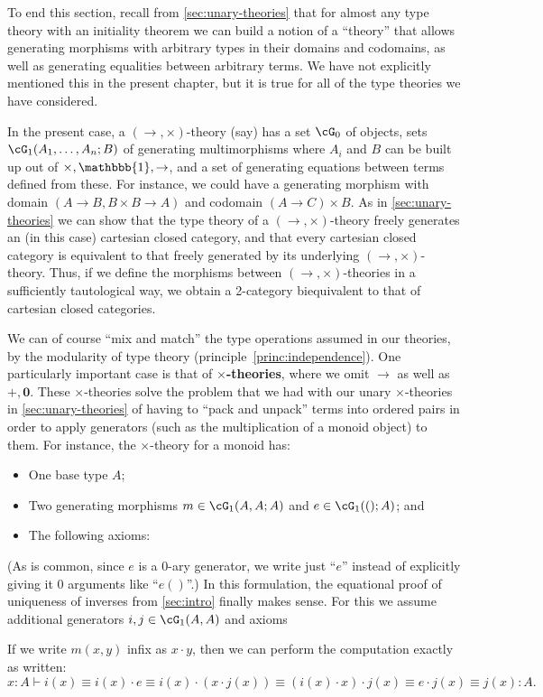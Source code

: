 \documentclass{book}
\let\types\vdash
\def\unit{\mathbbb{1}}%
\def\zero{\mathbf{0}}
\begin{document}
To end this section, recall from \cref{sec:unary-theories} that for almost any type theory with an initiality theorem we can build a notion of a ``theory'' that allows generating morphisms with arbitrary types in their domains and codomains, as well as generating equalities between arbitrary terms.
We have not explicitly mentioned this in the present chapter, but it is true for all of the type theories we have considered.

In the present case, a $(\to,\times)$-theory (say) has a set $\cG_0$ of objects, sets $\cG_1(A_1,\dots,A_n;B)$ of generating multimorphisms where $A_i$ and $B$ can be built up out of $\times,\unit,\to$, and a set of generating equations between terms defined from these.
For instance, we could have a generating morphism with domain $(A\to B, B\times B\to A)$ and codomain $(A\to C)\times B$.
As in \cref{sec:unary-theories} we can show that the type theory of a $(\to,\times)$-theory freely generates an (in this case) cartesian closed category, and that every cartesian closed category is equivalent to that freely generated by its underlying $(\to,\times)$-theory.
Thus, if we define the morphisms between $(\to,\times)$-theories in a sufficiently tautological way, we obtain a 2-category biequivalent to that of cartesian closed categories.

We can of course ``mix and match'' the type operations assumed in our theories, by the modularity of type theory (principle~\eqref{princ:independence}).
One particularly important case is that of \textbf{$\times$-theories}, where we omit $\to$ as well as $+,\zero$.
These $\times$-theories solve the problem that we had with our unary $\times$-theories in \cref{sec:unary-theories} of having to ``pack and unpack'' terms into ordered pairs in order to apply generators (such as the multiplication of a monoid object) to them.
For instance, the $\times$-theory for a monoid has:
\begin{itemize}
\item One base type $A$;
\item Two generating morphisms $m\in\cG_1(A,A;A)$ and $e\in \cG_1(();A)$; and
\item The following axioms:
\end{itemize}
(As is common, since $e$ is a 0-ary generator, we write just ``$e$'' instead of explicitly giving it 0 arguments like ``$e()$''.)
In this formulation, the equational proof of uniqueness of inverses from \cref{sec:intro} finally makes sense.
For this we assume additional generators $i,j\in \cG_1(A,A)$ and axioms
If we write $m(x,y)$ infix as $x\cdot y$, then we can perform the computation exactly as written:
\[ x:A \types i(x) \equiv i(x) \cdot e \equiv i(x) \cdot (x \cdot j(x)) \equiv (i(x)\cdot x)\cdot j(x) \equiv e\cdot j(x) \equiv j(x) : A.\]
\end{document}
